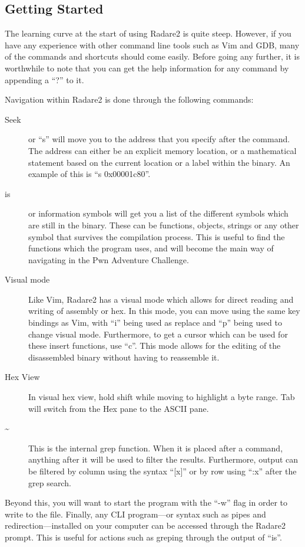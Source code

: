 		\subsection{Getting Started}
			The learning curve at the start of using Radare2 is quite steep. 
			However, if you have any experience with other command line tools such as Vim and GDB, many of the commands and shortcuts should come easily. 
			Before going any further, it is worthwhile to note that you can get the help information for any command by appending a ``?'' to it. 

			Navigation within Radare2 is done through the following commands:
			\begin{description}
				\item[Seek]
					or ``s'' will move you to the address that you specify after the command. 
					The address can either be an explicit memory location, or a mathematical statement based on the current location or a label within the binary. 
					An example of this is ``s 0x00001c80''.
				\item[is]
					or information symbols will get you a list of the different symbols which are still in the binary. 
					These can be functions, objects, strings or any other symbol that survives the compilation process. 
					This is useful to find the functions which the program uses, and will become the main way of navigating in the Pwn Adventure Challenge. 
				\item[Visual mode]
					Like Vim, Radare2 has a visual mode which allows for direct reading and writing of assembly or hex. 
					In this mode, you can move using the same key bindings as Vim, with ``i'' being used as replace and ``p'' being used to change visual mode. 
					Furthermore, to get a cursor which can be used for these insert functions, use ``c''.
					This mode allows for the editing of the disassembled binary without having to reassemble it. 
				\item[Hex View]
					In visual hex view, hold shift while moving to highlight a byte range. 
					Tab will switch from the Hex pane to the ASCII pane. 
				\item[\~{}]
					This is the internal grep function. 
					When it is placed after a command, anything after it will be used to filter the results. 
					Furthermore, output can be filtered by column using the syntax ``[x]'' or by row using ``:x'' after the grep search.
			\end{description}
			Beyond this, you will want to start the program with the ``-w'' flag in order to write to the file. 
			Finally, any CLI program---or syntax such as pipes and redirection---installed on your computer can be accessed through the Radare2 prompt. 
			This is useful for actions such as greping through the output of ``is''. 


